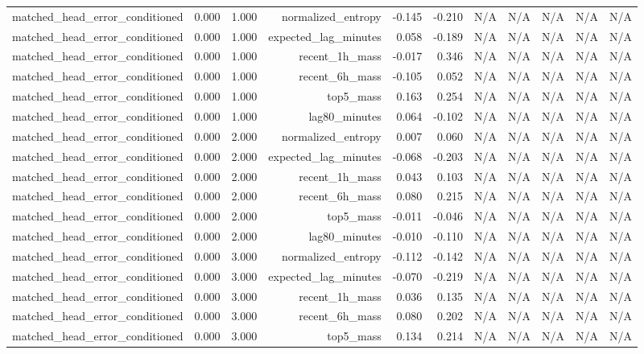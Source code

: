 \begin{table}[h!]
\begin{tabular}{lrrrrrrrrrr}
matched\_head\_error\_conditioned & 0.000 & 1.000 & normalized\_entropy & -0.145 & -0.210 & N/A & N/A & N/A & N/A & N/A \\
matched\_head\_error\_conditioned & 0.000 & 1.000 & expected\_lag\_minutes & 0.058 & -0.189 & N/A & N/A & N/A & N/A & N/A \\
matched\_head\_error\_conditioned & 0.000 & 1.000 & recent\_1h\_mass & -0.017 & 0.346 & N/A & N/A & N/A & N/A & N/A \\
matched\_head\_error\_conditioned & 0.000 & 1.000 & recent\_6h\_mass & -0.105 & 0.052 & N/A & N/A & N/A & N/A & N/A \\
matched\_head\_error\_conditioned & 0.000 & 1.000 & top5\_mass & 0.163 & 0.254 & N/A & N/A & N/A & N/A & N/A \\
matched\_head\_error\_conditioned & 0.000 & 1.000 & lag80\_minutes & 0.064 & -0.102 & N/A & N/A & N/A & N/A & N/A \\
matched\_head\_error\_conditioned & 0.000 & 2.000 & normalized\_entropy & 0.007 & 0.060 & N/A & N/A & N/A & N/A & N/A \\
matched\_head\_error\_conditioned & 0.000 & 2.000 & expected\_lag\_minutes & -0.068 & -0.203 & N/A & N/A & N/A & N/A & N/A \\
matched\_head\_error\_conditioned & 0.000 & 2.000 & recent\_1h\_mass & 0.043 & 0.103 & N/A & N/A & N/A & N/A & N/A \\
matched\_head\_error\_conditioned & 0.000 & 2.000 & recent\_6h\_mass & 0.080 & 0.215 & N/A & N/A & N/A & N/A & N/A \\
matched\_head\_error\_conditioned & 0.000 & 2.000 & top5\_mass & -0.011 & -0.046 & N/A & N/A & N/A & N/A & N/A \\
matched\_head\_error\_conditioned & 0.000 & 2.000 & lag80\_minutes & -0.010 & -0.110 & N/A & N/A & N/A & N/A & N/A \\
matched\_head\_error\_conditioned & 0.000 & 3.000 & normalized\_entropy & -0.112 & -0.142 & N/A & N/A & N/A & N/A & N/A \\
matched\_head\_error\_conditioned & 0.000 & 3.000 & expected\_lag\_minutes & -0.070 & -0.219 & N/A & N/A & N/A & N/A & N/A \\
matched\_head\_error\_conditioned & 0.000 & 3.000 & recent\_1h\_mass & 0.036 & 0.135 & N/A & N/A & N/A & N/A & N/A \\
matched\_head\_error\_conditioned & 0.000 & 3.000 & recent\_6h\_mass & 0.080 & 0.202 & N/A & N/A & N/A & N/A & N/A \\
matched\_head\_error\_conditioned & 0.000 & 3.000 & top5\_mass & 0.134 & 0.214 & N/A & N/A & N/A & N/A & N/A \\

\end{tabular}
\end{table}
